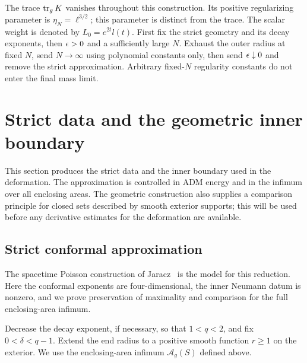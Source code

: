 The trace $\operatorname{tr}_gK$ vanishes throughout this construction.  Its
positive regularizing parameter is $\eta_N=\ell^{3/2}$; this parameter
is distinct from the trace.
The scalar weight is denoted by $L_0=e^{2t}l(t)$.
First fix the strict geometry and its decay exponents, then $\epsilon>0$ and
a sufficiently large $N$.  Exhaust the outer radius at fixed $N$, send
$N\to\infty$ using polynomial constants only, then send $\epsilon\downarrow0$
and remove the strict approximation.  Arbitrary fixed-$N$ regularity
constants do not enter the final mass limit.


\section{Strict data and the geometric inner boundary}
\label{four:maximal:sec:preparation}

This section produces the strict data and the inner boundary used in the
deformation.  The approximation is controlled in ADM energy and in the
infimum over all enclosing areas.  The geometric construction also supplies
a comparison principle for closed sets described by smooth exterior
supports; this will be used before any derivative estimates for the
deformation are available.

\subsection{Strict conformal approximation}

The spacetime Poisson construction of
Jaracz~\cite{Jaracz2025StrictDEC} is the model for this reduction.
Here the conformal exponents are four-dimensional, the inner Neumann
datum is nonzero, and we prove preservation of maximality and comparison
for the full enclosing-area infimum.

Decrease the decay exponent, if necessary, so that \(1<q<2\), and fix
\(0<\delta<q-1\).  Extend the end radius to a positive smooth function
\(r\ge1\) on the exterior.  We use the enclosing-area infimum
\(\mathcal A_g(S)\) defined above.

